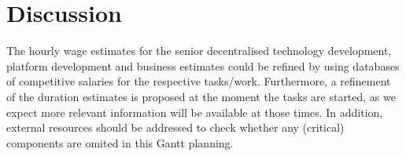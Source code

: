 \section{Discussion}\label{sec:discussion}
The hourly wage estimates for the senior decentralised technology development, platform development and business estimates could be refined by using databases of competitive salaries for the respective tasks/work. Furthermore, a refinement of the duration estimates is proposed at the moment the tasks are started, as we expect more relevant information will be available at those times. In addition, external resources should be addressed to check whether any (critical) components are omited in this Gantt planning.